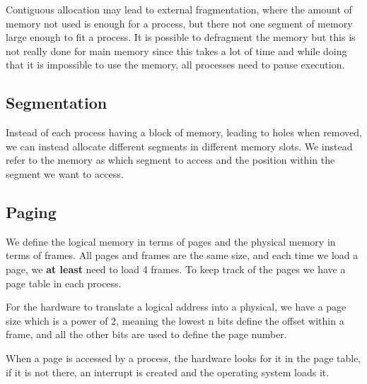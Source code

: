 Contiguous allocation may lead to external fragmentation, where the amount of memory not used is enough for a process, but there not one segment of memory large enough to fit a process. It is possible to defragment the memory but this is not really done for main memory since this takes a lot of time and while doing that it is impossible to use the memory, all processes need to pause execution.

\subsection{Segmentation}
Instead of each process having a block of memory, leading to holes when removed, we can instead allocate different segments in different memory slots. We instead refer to the memory as which segment to access and the position within the segment we want to access.

\subsection{Paging}
We define the logical memory in terms of pages and the physical memory in terms of frames. All pages and frames are the same size, and each time we load a page, we \textbf{at least} need to load 4 frames. To keep track of the pages we have a page table in each process.

For the hardware to translate a logical address into a physical, we have a page size which is a power of 2, meaning the lowest n bits define the offset within a frame, and all the other bits are used to define the page number.

When a page is accessed by a process, the hardware looks for it in the page table, if it is not there, an interrupt is created and the operating system loads it.